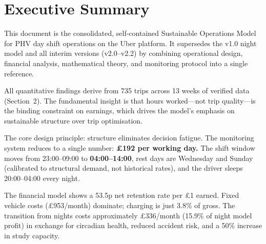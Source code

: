 \documentclass[a4paper,11pt]{article}
\begin{document}
\newpage

\section{Executive Summary}

This document is the consolidated, self-contained Sustainable Operations Model for PHV day shift operations on the Uber platform. It supersedes the v1.0 night model and all interim versions (v2.0--v2.2) by combining operational design, financial analysis, mathematical theory, and monitoring protocol into a single reference.

All quantitative findings derive from 735 trips across 13 weeks of verified data (Section~2). The fundamental insight is that hours worked---not trip quality---is the binding constraint on earnings, which drives the model's emphasis on sustainable structure over trip optimisation.

The core design principle: structure eliminates decision fatigue. The monitoring system reduces to a single number: \textbf{\pounds192 per working day.} The shift window moves from 23:00--09:00 to \textbf{04:00--14:00}, rest days are Wednesday and Sunday (calibrated to structural demand, not historical rates), and the driver sleeps 20:00--04:00 every night.

The financial model shows a 53.5p net retention rate per \pounds1 earned. Fixed vehicle costs (\pounds953/month) dominate; charging is just 3.8\% of gross. The transition from nights costs approximately \pounds336/month (15.9\% of night model profit) in exchange for circadian health, reduced accident risk, and a 50\% increase in study capacity.
\end{document}
